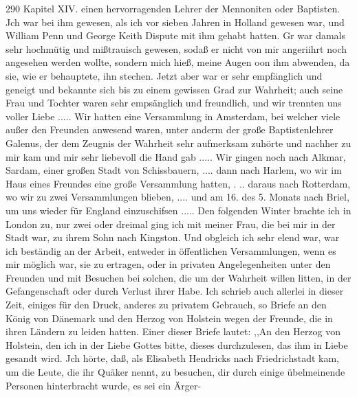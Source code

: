 290 Kapitel XIV.
einen hervorragenden Lehrer der Mennoniten oder Baptisten.
Jch war bei ihm gewesen, als ich vor sieben Jahren in Holland
gewesen war, und William Penn und George Keith Dispute
mit ihm gehabt hatten. Gr war damals sehr hochmütig und
mißtrauisch gewesen, sodaß er nicht von mir angeriihrt noch
angesehen werden wollte, sondern mich hieß, meine Augen oon
ihm abwenden, da sie, wie er behauptete, ihn stechen. Jetzt aber
war er sehr empfänglich und geneigt und bekannte sich bis zu
einem gewissen Grad zur Wahrheit; auch seine Frau und Tochter
waren sehr empsänglich und freundlich, und wir trennten uns
voller Liebe .....
Wir hatten eine Versammlung in Amsterdam, bei welcher
viele außer den Freunden anwesend waren, unter anderm der
große Baptistenlehrer Galenus, der dem Zeugnis der Wahrheit
sehr aufmerksam zuhörte und nachher zu mir kam und mir sehr
liebevoll die Hand gab .....
Wir gingen noch nach Alkmar, Sardam, einer großen Stadt
von Schissbauern, .... dann nach Harlem, wo wir im Haus
eines Freundes eine große Versammlung hatten, . .. daraus nach
Rotterdam, wo wir zu zwei Versammlungen blieben, .... und
am 16. des 5. Monats nach Briel, um uns wieder für England
einzuschifsen .....
Den folgenden Winter brachte ich in London zu, nur zwei
oder dreimal ging ich mit meiner Frau, die bei mir in der
Stadt war, zu ihrem Sohn nach Kingston. Und obgleich ich
sehr elend war, war ich beständig an der Arbeit, entweder in
öffentlichen Versammlungen, wenn es mir möglich war, sie zu
ertragen, oder in privaten Angelegenheiten unter den Freunden
und mit Besuchen bei solchen, die um der Wahrheit willen litten,
in der Gefangenschaft oder durch Verlust ihrer Habe. Ich schrieb
auch allerlei in dieser Zeit, einiges für den Druck, anderes zu
privatem Gebrauch, so Briefe an den König von Dänemark und
den Herzog von Holstein wegen der Freunde, die in ihren Ländern
zu leiden hatten. Einer dieser Briefe lautet:
,,An den Herzog von Holstein, den ich in der Liebe Gottes
bitte, dieses durchzulesen, das ihm in Liebe gesandt wird.
Jch hörte, daß, als Elisabeth Hendricks nach Friedrichstadt
kam, um die Leute, die ihr Quäker nennt, zu besuchen, dir durch
einige übelmeinende Personen hinterbracht wurde, es sei ein Ärger-


